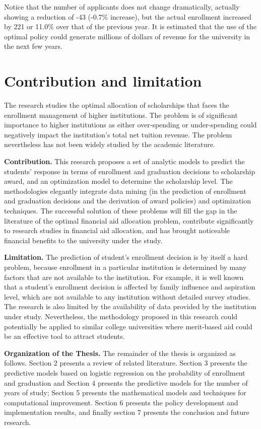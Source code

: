 \documentclass[12pt,english]{report}
\begin{document}
Notice that the number of applicants does not change dramatically, actually showing a reduction of -43 (-0.7\% increase), but the actual enrollment increased by 221  or 11.0\% over that of the previous year.  It is estimated that the use of the optimal policy could generate millions of dollars of revenue for the university in the next few years.

\section{Contribution and limitation}
The research studies the optimal allocation of scholarships that faces the enrollment management of higher institutions.  The problem is of significant importance to higher institutions as either over-spending or under-spending could negatively impact the institution's total net tuition revenue.  The problem nevertheless has not been widely studied by the academic literature.

\textbf{Contribution.} This research proposes a set of analytic models to predict the students' response in terms of enrollment and graduation decisions to scholarship award, and an optimization model to determine the scholarship level.  The methodologies elegantly integrate data mining (in the prediction of enrollment and graduation decisions and the derivation of award policies) and optimization techniques. The successful solution of these problems will fill the gap in the literature of the optimal financial aid allocation problem, contribute significantly to research studies in financial aid allocation, and has brought noticeable financial benefits to the university under the study.

\textbf{Limitation.} The prediction of student's enrollment decision is by itself a hard problem,  because enrollment in a particular institution is determined by many factors that are not available to the institution.  For example, it is well known that a student's enrollment decision is affected by family influence and aspiration level, which are not available to any institution without detailed survey studies.  The research is also limited by the availability of data provided by the institution under study.   Nevertheless, the methodology proposed in this research could potentially be applied to similar college universities where merit-based aid could be an effective tool to attract students.

\vspace{0.25in}
\noindent \textbf{Organization of the Thesis.} The remainder of the thesis is organized as follows. Section 2 presents a review of related literature. Section 3 presents the predictive models based on logistic regression on the probability of enrollment and graduation and Section 4 presents the predictive models for the number of years of study; Section 5 presents the mathematical models and techniques for computational improvement. Section 6 presents the policy development and implementation results, and finally section 7 presents the conclusion and  future research.
\end{document}
